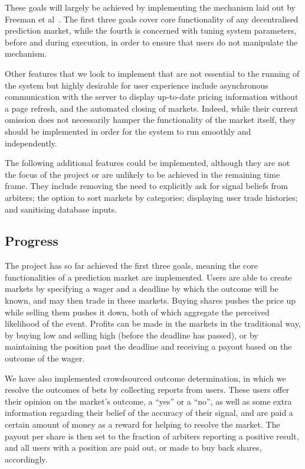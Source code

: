 \documentclass[10pt,a4paper]{article}
\theoremstyle{plain}
\theoremstyle{definition}
\begin{document}
These goals will largely be achieved by implementing the mechanism laid out by
Freeman et al~\cite{CODiPM}. The first three goals cover core functionality of
any decentralised prediction market, while the fourth is concerned with tuning
system parameters, before and during execution, in order to ensure that users
do not manipulate the mechanism.
 
Other features that we look to implement that are not essential to the running
of the system but highly desirable for user experience include asynchronous
communication with the server to display up-to-date pricing information without
a page refresh, and the automated closing of markets. Indeed, while their
current omission does not necessarily hamper the functionality of the market
itself, they should be implemented in order for the system to run smoothly and
independently.

The following additional features could be implemented, although they are not
the focus of the project or are unlikely to be achieved in the remaining time
frame. They include removing the need to explicitly ask for signal beliefs
from arbiters; the option to sort markets by categories; displaying user trade
histories; and sanitising database inputs.

\subsection{Progress} 

The project has so far achieved the first three goals, meaning the core
functionalities of a prediction market are implemented. Users are able to
create markets by specifying a wager and a deadline by which the outcome will
be known, and may then trade in these markets. Buying shares pushes the price
up while selling them pushes it down, both of which aggregate the perceived
likelihood of the event. Profits can be made in the markets in the traditional
way, by buying low and selling high (before the deadline has passed), or by
maintaining the position past the deadline and receiving a payout based on the
outcome of the wager.

We have also implemented crowdsourced outcome determination, in which we
resolve the outcomes of bets by collecting reports from users. These users
offer their opinion on the market's outcome, a ``yes'' or a ``no'', as well as
some extra information regarding their belief of the accuracy of their signal,
and are paid a certain amount of money as a reward for helping to resolve the
market. The payout per share is then set to the fraction of arbiters reporting
a positive result, and all users with a position are paid out, or made to buy
back shares, accordingly.
\end{document}
